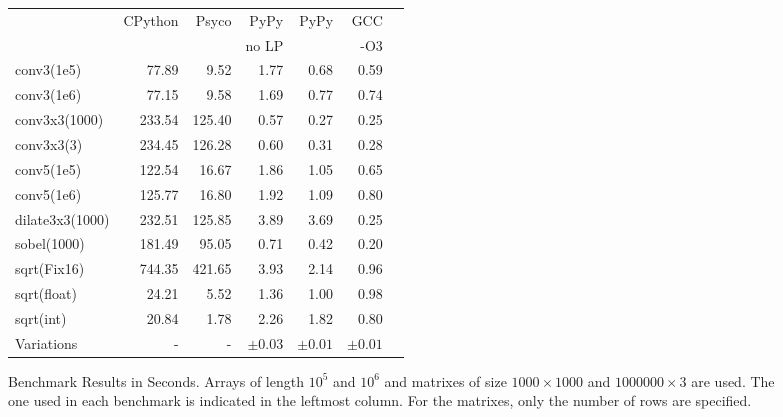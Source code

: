 \documentclass[preprint]{sigplanconf}
\begin{document}
\begin{figure}
\begin{center}
{\smaller
\begin{tabular}{|l|r|r|r|r|r|r|}
\hline
 & CPython & Psyco & PyPy  & PyPy & GCC \\
 &         &       & no LP &      & -O3 \\
\hline
conv3(1e5) & 77.89 & 9.52 & 1.77  & 0.68 &  0.59 \\
\hline
conv3(1e6) & 77.15 & 9.58 & 1.69  & 0.77 &  0.74 \\
\hline
conv3x3(1000) & 233.54 & 125.40 & 0.57 & 0.27 & 0.25 \\
\hline
conv3x3(3) & 234.45 & 126.28 & 0.60 & 0.31 & 0.28 \\
\hline
conv5(1e5) & 122.54 & 16.67 & 1.86  & 1.05 &  0.65\\
\hline
conv5(1e6) & 125.77 & 16.80 & 1.92 & 1.09 &  0.80 \\
\hline
dilate3x3(1000) & 232.51 & 125.85 & 3.89 & 3.69 & 0.25 \\
\hline
sobel(1000) & 181.49 & 95.05 & 0.71 & 0.42 & 0.20 \\
\hline
sqrt(Fix16) & 744.35 & 421.65 & 3.93  & 2.14  & 0.96 \\
\hline
sqrt(float) & 24.21 & 5.52 & 1.36 & 1.00 & 0.98\\
\hline
sqrt(int) & 20.84 & 1.78 & 2.26 & 1.82  & 0.80 \\
\hline
\hline
Variations & - & - & $\pm 0.03$ & $\pm 0.01$ & $\pm 0.01$ \\
\hline
\end{tabular}
}
\end{center}
\label{fig:benchmarks}
\caption{Benchmark Results in Seconds. Arrays of length $10^5$ and
  $10^6$ and matrixes of size $1000\times 1000$ and $1000000 \times
  3$ are used. The one used in each benchmark is indicated in
  the leftmost column. For the matrixes, only the number of rows are
  specified.} 
\end{figure}
\end{document}
